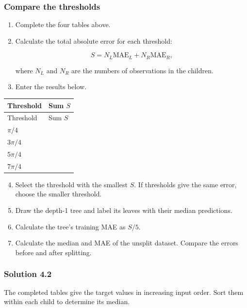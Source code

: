 \documentclass[10pt]{article}
\begin{document}
\subsubsection*{Compare the thresholds}
\begin{enumerate}
\item
Complete the four tables above.

\item
Calculate the total absolute error for each threshold:

\[
S=N_L\mathrm{MAE}_L+N_R\mathrm{MAE}_R,
\]

where $N_L$ and $N_R$ are the numbers of observations in the children.

\item
Enter the results below.

\end{enumerate}
\begingroup
\small
\setlength{\tabcolsep}{4pt}
\begin{longtable}{l|l}
Threshold & Sum $S$ \\
\hline
\endfirsthead
Threshold & Sum $S$ \\
\hline
\endhead
$\pi/4$ & $\phantom{0}$ \\[3pt]
$3\pi/4$ & $\phantom{0}$ \\[3pt]
$5\pi/4$ & $\phantom{0}$ \\[3pt]
$7\pi/4$ & $\phantom{0}$ \\[3pt]
\end{longtable}
\endgroup
\begin{enumerate}
\setcounter{enumi}{3}
\item
Select the threshold with the smallest $S$. If thresholds give the same error, choose the smaller threshold.

\item
Draw the depth-1 tree and label its leaves with their median predictions.

\item
Calculate the tree's training MAE as $S/5$.

\item
Calculate the median and MAE of the unsplit dataset. Compare the errors before and after splitting.

\end{enumerate}
\begingroup\color{red}

\subsubsection*{Solution 4.2}
The completed tables give the target values in increasing input order.
Sort them within each child to determine its median.
\end{document}
